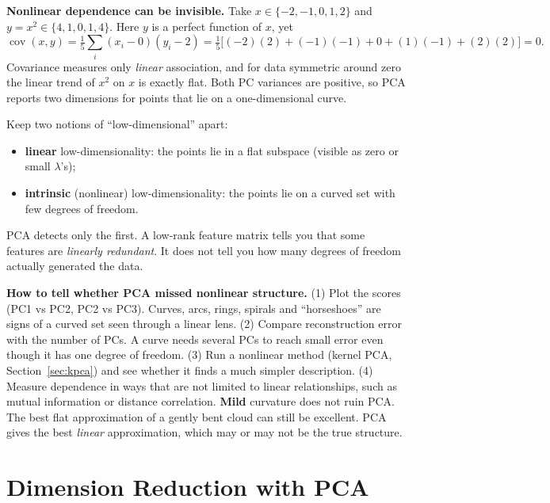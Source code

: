 \documentclass[11pt]{article}
\begin{document}
\textbf{Nonlinear dependence can be invisible.} Take $x\in\{-2,-1,0,1,2\}$ and
$y=x^2\in\{4,1,0,1,4\}$. Here $y$ is a perfect function of $x$, yet
\[
\operatorname{cov}(x,y)=\tfrac15\sum_i(x_i-0)(y_i-2)=\tfrac15\big[(-2)(2)+(-1)(-1)+0+(1)(-1)+(2)(2)\big]=0 .
\]
Covariance measures only \emph{linear} association, and for data symmetric around zero
the linear trend of $x^2$ on $x$ is exactly flat. Both PC variances are positive, so PCA
reports two dimensions for points that lie on a one-dimensional curve.

\begin{intuition}
Keep two notions of ``low-dimensional'' apart:
\begin{itemize}[nosep]
\item \textbf{linear} low-dimensionality: the points lie in a flat subspace (visible as zero or small $\lambda$'s);
\item \textbf{intrinsic} (nonlinear) low-dimensionality: the points lie on a curved set with few degrees of freedom.
\end{itemize}
PCA detects only the first. A low-rank feature matrix tells you that some features are
\emph{linearly redundant}. It does not tell you how many degrees of freedom actually
generated the data.
\end{intuition}

\begin{deeper}
\textbf{How to tell whether PCA missed nonlinear structure.} (1) Plot the scores
(PC1 vs PC2, PC2 vs PC3). Curves, arcs, rings, spirals and ``horseshoes'' are signs of
a curved set seen through a linear lens. (2) Compare reconstruction error with the
number of PCs. A curve needs several PCs to reach small error even though it has one
degree of freedom. (3) Run a nonlinear method (kernel PCA, Section~\ref{sec:kpca}) and see
whether it finds a much simpler description. (4) Measure dependence in ways that are not
limited to linear relationships, such as mutual information or distance correlation.
\textbf{Mild} curvature does not ruin PCA. The best flat approximation of a gently bent
cloud can still be excellent. PCA gives the best \emph{linear} approximation, which may
or may not be the true structure.
\end{deeper}

\section{Dimension Reduction with PCA}
\end{document}
